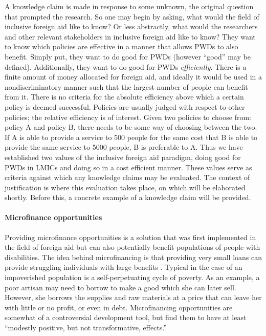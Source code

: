 \documentclass[a4paper]{article}
\begin{document}
A knowledge claim is made in response to some unknown, the original question
that prompted the research. So one may begin by asking, what would the field
of inclusive foreign aid like to know? Or less abstractly, what would the
researchers and other relevant stakeholders in inclusive foreign aid like to
know? They want to know which policies are effective in a manner that allows
PWDs to also benefit. Simply put, they want to do good for PWDs (however
``good'' may be defined). Additionally, they want to do good for PWDs
\emph{efficiently}. There is a finite amount of money allocated for foreign
aid, and ideally it would be used in a nondiscriminatory manner such that the
largest number of people can benefit from it. There is no criteria for the
absolute efficiency above which a certain policy is deemed successful.
Policies are usually judged with respect to other policies; the relative
efficiency is of interest. Given two policies to choose from: policy A and
policy B, there needs to be some way of choosing between the two. If A is able
to provide a service to 500 people for the same cost that B is able to provide
the same service to 5000 people, B is preferable to A. Thus we have
established two values of the inclusive foreign aid paradigm, doing good for
PWDs in LMICs and doing so in a cost efficient manner. These values serve as
criteria against which any knowledge claims may be evaluated. The context of
justification is where this evaluation takes place, on which will be
elaborated shortly. Before this, a concrete example of a knowledge claim will
be provided.

\paragraph{Microfinance opportunities}

Providing microfinance opportunities is a solution that was first implemented
in the field of foreign aid but can also potentially benefit populations of
people with disabilities. The idea behind microfinancing is that providing
very small loans can provide struggling individuals with large benefits
\citep{wendt2006building}. Typical in the case of an impoverished population
is a self-perpetuating cycle of poverty. As an example, a poor artisan may
need to borrow to make a good which she can later sell. However, she borrows
the supplies and raw materials at a price that can leave her with little or no
profit, or even in debt. Microfinancing opportunities are somewhat of a
controversial development tool, but \cite{banerjee2015six} find them to have
at least ``modestly positive, but not transformative, effects.''
\end{document}
